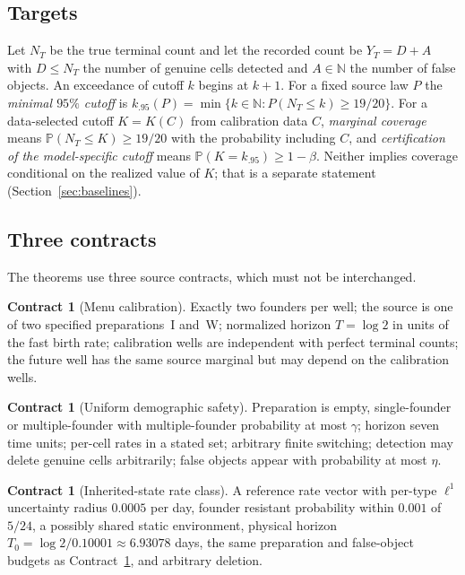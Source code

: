 \documentclass[11pt,a4paper]{article}
\theoremstyle{plain}
\theoremstyle{definition}
\newtheorem{contract}[theorem]{Contract}
\theoremstyle{remark}
\newcommand{\N}{\mathbb N}
\newcommand{\PP}{\mathbb P}
\begin{document}
\subsection{Targets}
Let $N_T$ be the true terminal count and let the recorded count be $Y_T=D+A$ with $D\le N_T$ the number of genuine cells detected and $A\in\N$ the number of false objects. An exceedance of cutoff $k$ begins at $k+1$. For a fixed source law $P$ the \emph{minimal $95\%$ cutoff} is $k_{.95}(P)=\min\{k\in\N:P(N_T\le k)\ge19/20\}$. For a data-selected cutoff $K=K(C)$ from calibration data $C$, \emph{marginal coverage} means $\PP(N_T\le K)\ge19/20$ with the probability including $C$, and \emph{certification of the model-specific cutoff} means $\PP(K=k_{.95})\ge1-\beta$. Neither implies coverage conditional on the realized value of $K$; that is a separate statement (Section~\ref{sec:baselines}).

\subsection{Three contracts}
The theorems use three source contracts, which must not be interchanged.

\begin{contract}[Menu calibration]\label{con:menu}
Exactly two founders per well; the source is one of two specified preparations~I and~W; normalized horizon $T=\log2$ in units of the fast birth rate; calibration wells are independent with perfect terminal counts; the future well has the same source marginal but may depend on the calibration wells.
\end{contract}

\begin{contract}[Uniform demographic safety]\label{con:box}
Preparation is empty, single-founder or multiple-founder with multiple-founder probability at most $\gamma$; horizon seven time units; per-cell rates in a stated set; arbitrary finite switching; detection may delete genuine cells arbitrarily; false objects appear with probability at most $\eta$.
\end{contract}

\begin{contract}[Inherited-state rate class]\label{con:class}
A reference rate vector with per-type $\ell^1$ uncertainty radius $0.0005$ per day, founder resistant probability within $0.001$ of $5/24$, a possibly shared static environment, physical horizon $T_0=\log2/0.10001\approx6.93078$ days, the same preparation and false-object budgets as Contract~\ref{con:box}, and arbitrary deletion.
\end{contract}
\end{document}
